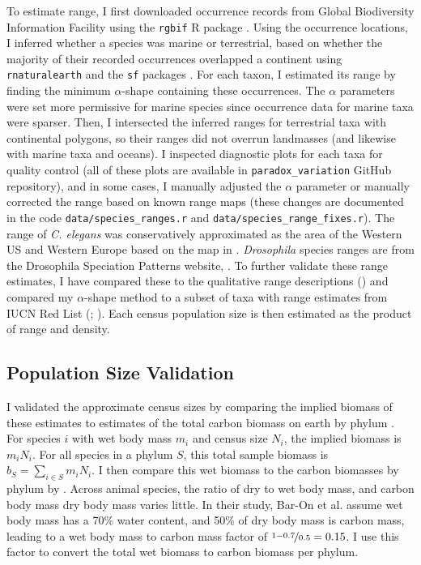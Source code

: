 \documentclass[9pt,lineno]{elife}
\begin{document}
To estimate range, I first downloaded occurrence records from Global
Biodiversity Information Facility \citep{noauthor_2020-ey} using the
\texttt{rgbif} R package \citep{Chamberlain2014-up,Chamberlain2017-uz}.  Using
the occurrence locations, I inferred whether a species was marine or
terrestrial, based on whether the majority of their recorded occurrences
overlapped a continent using \texttt{rnaturalearth} and the \texttt{sf}
packages \citep{South2017-db,Pebesma2018-bs}. For each taxon, I estimated its
range by finding the minimum $\alpha$-shape containing these occurrences.  The
$\alpha$ parameters were set more permissive for marine species since
occurrence data for marine taxa were sparser. Then, I intersected the inferred
ranges for terrestrial taxa with continental polygons, so their ranges did not
overrun landmasses (and likewise with marine taxa and oceans). I inspected
diagnostic plots for each taxa for quality control (all of these plots are
available in \texttt{paradox\_variation} GitHub repository), and in some cases,
I manually adjusted the $\alpha$ parameter or manually corrected the range
based on known range maps (these changes are documented in the code
\texttt{data/species\_ranges.r} and \texttt{data/species\_range\_fixes.r}).
The range of \emph{C. elegans} was conservatively approximated as the area of
the Western US and Western Europe based on the map in \cite{Frezal2015-iw}.
\emph{Drosophila} species ranges are from the Drosophila Speciation Patterns
website, \citep{Yukilevich2012-vn,Yukilevich2017-jg}. To further validate these
range estimates, I have compared these to the qualitative range descriptions
\cite{Leffler2012-zj} () and compared my
$\alpha$-shape method to a subset of taxa with range estimates from IUCN Red
List (\cite{Chamberlain2020-tv,Iucn2020-ap};
). Each census population size is then
estimated as the product of range and density. 

\subsection{Population Size Validation}
\label{supp:popsize-valid}

I validated the approximate census sizes by comparing the implied biomass of
these estimates to estimates of the total carbon biomass on earth by phylum
\citep{Bar-On2018-kc}. For species $i$ with wet body mass $m_i$ and census
size $N_i$, the implied biomass is $m_i N_i$. For all species in a phylum $S$,
this total sample biomass is $b_S = \sum_{i \in S} m_i N_i$. I then compare
this wet biomass to the carbon biomasses by phylum by \cite{Bar-On2018-kc}.
Across animal species, the ratio of dry to wet body mass, and carbon body mass
dry body mass varies little. In their study, Bar-On et al. assume wet body mass
has a 70\% water content, and 50\% of dry body mass is carbon mass, leading to
a wet body mass to carbon mass factor of $\nicefrac{1-0.7}{0.5} = 0.15$. I use
this factor to convert the total wet biomass to carbon biomass per phylum. 
\end{document}

